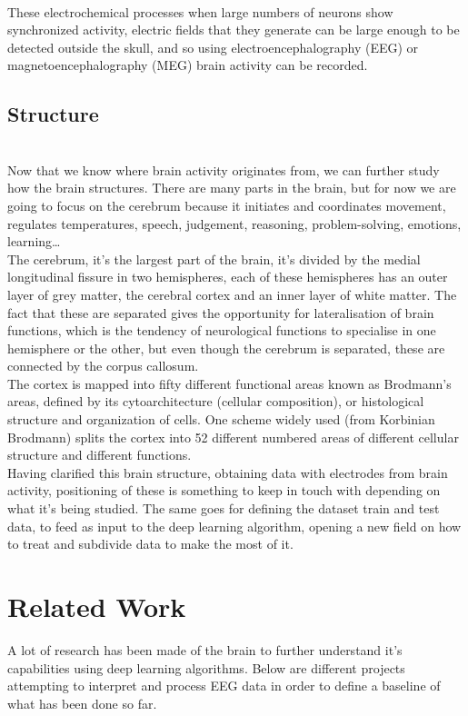﻿\documentclass[10pt,a4paper,twocolumn,twoside]{article}
\begin{document}
\leavevmode\\
These electrochemical processes when large numbers of neurons show synchronized activity, electric fields that they generate can be large enough to be detected outside the skull, and so using electroencephalography (EEG) or magnetoencephalography (MEG) brain activity can be recorded.
\\

\subsection{Structure}
\label{subsec-structure}
\leavevmode\\
Now that we know where brain activity originates from, we can further study how the brain structures. There are many parts in the brain, but for now we are going to focus on the cerebrum because it initiates and coordinates movement, regulates temperatures, speech, judgement, reasoning, problem-solving, emotions, learning…
\\
The cerebrum, it’s the largest part of the brain, it’s divided by the medial longitudinal fissure in two hemispheres, each of these hemispheres has an outer layer of grey matter, the cerebral cortex and an inner layer of white matter. The fact that these are separated gives the opportunity for lateralisation of brain functions, which is the tendency of neurological functions to specialise in one hemisphere or the other, but even though the cerebrum is separated, these are connected by the corpus callosum.
\\
The cortex is mapped into fifty different functional areas known as Brodmann’s areas, defined by its cytoarchitecture (cellular composition), or histological structure and organization of cells. One scheme widely used (from Korbinian Brodmann) splits the cortex into 52 different numbered areas of different cellular structure and different functions.
\\
Having clarified this brain structure, obtaining data with electrodes from brain activity, positioning of these is something to keep in touch with depending on what it’s being studied. The same goes for defining the dataset train and test data, to feed as input to the deep learning algorithm, opening a new field on how to treat and subdivide data to make the most of it.
\\

\section{Related Work}
\label{sec-related-work}
A lot of research has been made of the brain to further understand it’s capabilities using deep learning algorithms. Below are different projects attempting to interpret and process EEG data in order to define a baseline of what has been done so far. 
\\
\end{document}
